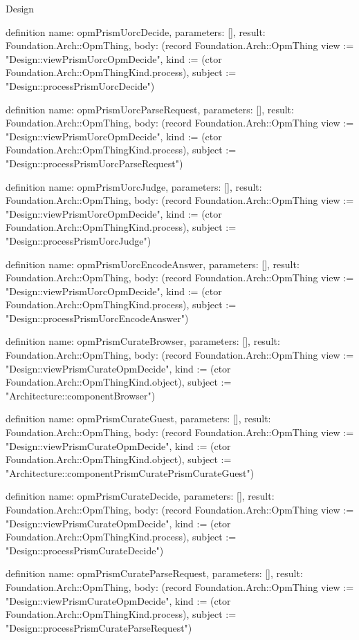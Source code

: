 \begin{lexlean}{Design}
\begin{semanticmodule}
definition{
  name: opmPrismUorcDecide,
  parameters: [],
  result: Foundation.Arch::OpmThing,
  body: (record Foundation.Arch::OpmThing {view := "Design::viewPrismUorcOpmDecide", kind := (ctor Foundation.Arch::OpmThingKind.process), subject := "Design::processPrismUorcDecide"})
}

definition{
  name: opmPrismUorcParseRequest,
  parameters: [],
  result: Foundation.Arch::OpmThing,
  body: (record Foundation.Arch::OpmThing {view := "Design::viewPrismUorcOpmDecide", kind := (ctor Foundation.Arch::OpmThingKind.process), subject := "Design::processPrismUorcParseRequest"})
}

definition{
  name: opmPrismUorcJudge,
  parameters: [],
  result: Foundation.Arch::OpmThing,
  body: (record Foundation.Arch::OpmThing {view := "Design::viewPrismUorcOpmDecide", kind := (ctor Foundation.Arch::OpmThingKind.process), subject := "Design::processPrismUorcJudge"})
}

definition{
  name: opmPrismUorcEncodeAnswer,
  parameters: [],
  result: Foundation.Arch::OpmThing,
  body: (record Foundation.Arch::OpmThing {view := "Design::viewPrismUorcOpmDecide", kind := (ctor Foundation.Arch::OpmThingKind.process), subject := "Design::processPrismUorcEncodeAnswer"})
}

definition{
  name: opmPrismCurateBrowser,
  parameters: [],
  result: Foundation.Arch::OpmThing,
  body: (record Foundation.Arch::OpmThing {view := "Design::viewPrismCurateOpmDecide", kind := (ctor Foundation.Arch::OpmThingKind.object), subject := "Architecture::componentBrowser"})
}

definition{
  name: opmPrismCurateGuest,
  parameters: [],
  result: Foundation.Arch::OpmThing,
  body: (record Foundation.Arch::OpmThing {view := "Design::viewPrismCurateOpmDecide", kind := (ctor Foundation.Arch::OpmThingKind.object), subject := "Architecture::componentPrismCuratePrismCurateGuest"})
}

definition{
  name: opmPrismCurateDecide,
  parameters: [],
  result: Foundation.Arch::OpmThing,
  body: (record Foundation.Arch::OpmThing {view := "Design::viewPrismCurateOpmDecide", kind := (ctor Foundation.Arch::OpmThingKind.process), subject := "Design::processPrismCurateDecide"})
}

definition{
  name: opmPrismCurateParseRequest,
  parameters: [],
  result: Foundation.Arch::OpmThing,
  body: (record Foundation.Arch::OpmThing {view := "Design::viewPrismCurateOpmDecide", kind := (ctor Foundation.Arch::OpmThingKind.process), subject := "Design::processPrismCurateParseRequest"})
}


\end{semanticmodule}
\end{lexlean}

